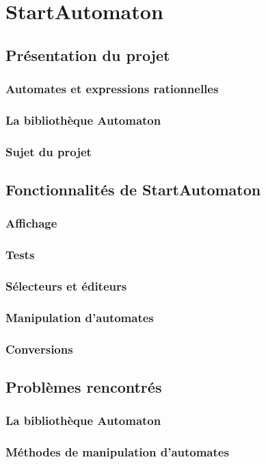 \documentclass[a4paper, 12pt]{report}
\begin{document}
\chapter{StartAutomaton}
\section{Présentation du projet}
\subsection{Automates et expressions rationnelles}
\subsection{La bibliothèque Automaton}
\subsection{Sujet du projet}

\section{Fonctionnalités de StartAutomaton}
\subsection{Affichage}
\subsection{Tests}
\subsection{Sélecteurs et éditeurs}
\subsection{Manipulation d'automates}
\subsection{Conversions}

\section{Problèmes rencontrés}
\subsection{La bibliothèque Automaton}
\subsection{Méthodes de manipulation d'automates}
\end{document}
